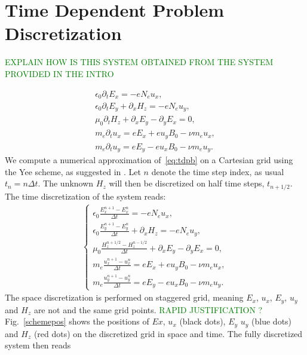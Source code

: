 \section{Time Dependent Problem Discretization}
\textcolor{green}{EXPLAIN HOW IS THIS SYSTEM OBTAINED FROM THE SYSTEM PROVIDED IN THE INTRO}

 \begin{align}
 \epsilon_0\partial_t E_{x}=-eN_e u_x, \nonumber\\
 \epsilon_0\partial_t E_{y}+\partial_x H_z=-eN_e u_y,\nonumber\\
 \mu_0\partial_t H_z+\partial_x E_y-\partial_y E_x=0, \label{eq:tdpb}\\
 m_e\partial_t u_x=eE_x+eu_yB_0-\nu m_e u_x,\nonumber\\
 m_e\partial_t u_y=eE_y-eu_xB_0-\nu m_e u_y.\nonumber
 \end{align}
We compute a numerical approximation of~\eqref{eq:tdpb} on a Cartesian grid using the Yee scheme, as  suggested in \cite{stable_yee_plasma_current}. Let $n$ denote the time step index, as usual $t_n = n \Delta t$. The unknown $H_z$ will then be discretized on half time steps, $t_{n+1/2}$. The time discretization of the system reads:
 \begin{align}
 \left\{\begin{array}{l}
 \epsilon_0\frac{ E_{x}^{n+1}-E_x^{n}}{\Delta t}=-eN_e u_x, \nonumber\\
 \epsilon_0\frac{ E_{y}^{n+1}-E_y^{n}}{\Delta t}+\partial_x H_z=-eN_e u_y,\nonumber\\
 \mu_0\frac{ H_z^{n+1/2}-H_z^{n-1/2}}{\Delta t}+\partial_x E_y-\partial_y E_x=0, \label{eq:tdiscretizedpb}\\
 m_e\frac{ u_{x}^{n+1}-u_x^{n}}{\Delta t}=eE_x+eu_yB_0-\nu m_e u_x,\nonumber\\
 m_e\frac{u_{y}^{n+1}-u_y^{n}}{\Delta t}=eE_y-eu_xB_0-\nu m_e u_y.\nonumber
\end{array}\right.
 \end{align}
The space discretization is performed on staggered grid, meaning $E_x$, $u_x$, $E_y$, $u_y$ and $H_z$ are not and the same grid points. \textcolor{green}{RAPID JUSTIFICATION ?}  Fig.~\ref{schemepos} shows the positions of $Ex$, $u_x$ (black dots), $E_y$ $u_y$ (blue dots) and $H_z$ (red dots) on the discretized grid in space and time. The fully discretized system then reads

